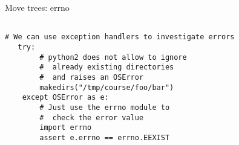 \begin{frame}[fragile]{Move trees: errno}
\begin{verbatim}

# We can use exception handlers to investigate errors
   try:
        # python2 does not allow to ignore
        #  already existing directories
        #  and raises an OSError
        makedirs("/tmp/course/foo/bar")
    except OSError as e:
        # Just use the errno module to
        #  check the error value
        import errno
        assert e.errno == errno.EEXIST
\end{verbatim}
\end{frame}

